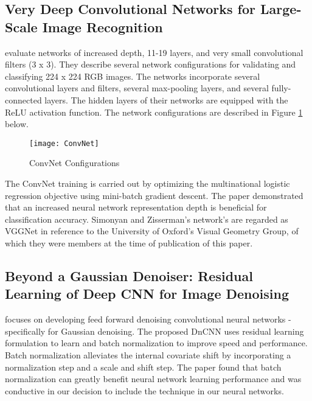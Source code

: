 \documentclass[12pt, titlepage]{article}
\begin{document}
\subsection{Very Deep Convolutional Networks for Large-Scale Image Recognition}
	
\noindent \cite{simonyan2014very} evaluate networks of increased depth, 11-19 layers, and very small convolutional filters (3 x 3). They describe several network configurations for validating and classifying 224 x 224 RGB images. The networks incorporate several convolutional layers and filters, several max-pooling layers, and several fully-connected layers. The hidden layers of their networks are equipped with the ReLU activation function. The network configurations are described in Figure \ref{ConvNet} below.
	
	\begin{figure}[h!]
		\begin{center}
			\texttt{[image: ConvNet]}
			\caption{ConvNet Configurations}
			\label{ConvNet}
		\end{center}
	\end{figure}
	
\noindent The ConvNet training is carried out by optimizing the multinational logistic regression objective using mini-batch gradient descent. The paper demonstrated that an increased neural network representation depth is beneficial for classification accuracy. Simonyan and Zisserman's network's are regarded as VGGNet in reference to the University of Oxford's Visual Geometry Group, of which they were members at the time of publication of this paper.\\ 
	
\subsection{Beyond a Gaussian Denoiser: Residual Learning of Deep CNN for Image Denoising}

\cite{zhang2017beyond} focuses on developing feed forward denoising convolutional neural networks - specifically for Gaussian denoising. The proposed DnCNN uses residual learning formulation to learn and batch normalization to improve speed and performance. Batch normalization alleviates the internal covariate shift by incorporating a normalization step and a scale and shift step. The paper found that batch normalization can greatly benefit neural network learning performance and was conductive in our decision to include the technique in our neural networks.\\
	
\end{document}
